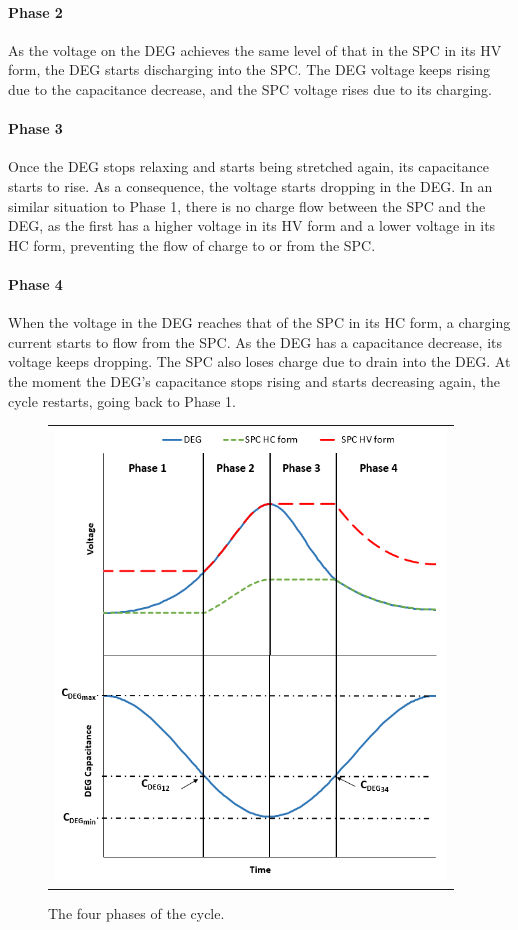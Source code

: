 \paragraph{Phase 2} As the voltage on the DEG achieves the same level of that in the SPC in its HV form, the DEG starts discharging into the SPC. The DEG voltage keeps rising due to the capacitance decrease, and the SPC voltage rises due to its charging.
\paragraph{Phase 3} Once the DEG stops relaxing and starts being stretched again, its capacitance starts to rise. As a consequence, the voltage starts dropping in the DEG. In an similar situation to Phase 1, there is no charge flow between the SPC and the DEG, as the first has a higher voltage in its HV form and a lower voltage in its HC form, preventing the flow of charge to or from the SPC.
\paragraph{Phase 4} When the voltage in the DEG reaches that of the SPC in its HC form, a charging current starts to flow from the SPC. As the DEG has a capacitance decrease, its voltage keeps dropping. The SPC also loses charge due to drain into the DEG. At the moment the DEG's capacitance stops rising and starts decreasing again, the cycle restarts, going back to Phase 1.


\begin{figure}[ht]
\begin{center}
\begin{tabular}{c}
\includegraphics[height=12cm]{fig03/Phasestgt2.png}
\end{tabular}
\end{center}
\caption 
{ \label{fig:cycleph}
The four phases of the cycle.} 
\end{figure}

